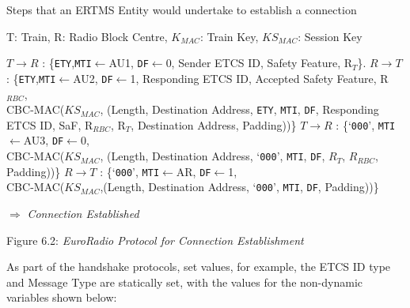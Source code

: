 \documentclass[twoside,11pt,a4paper]{article}
\begin{document}
\begin{algorithm}[H]
\renewcommand{\thealgorithm}{}
\caption{Steps that an ERTMS Entity would undertake to establish a connection}
T: Train, R: Radio Block Centre, $K_{MAC}$: Train Key, $KS_{MAC}$: Session Key
\label{EuroRadio Protocol}
\begin{algorithmic}[1]
\STATE $T\rightarrow{R}$ : \{\texttt{ETY},\texttt{MTI}$\gets$AU1, \texttt{DF}$\gets$0, Sender ETCS ID, Safety Feature, R$_T$\}.
\STATE $R\rightarrow{T}$ : \{\texttt{ETY},\texttt{MTI}$\gets$AU2, \texttt{DF}$\gets$1, Responding ETCS ID, Accepted Safety Feature, R$_{RBC}$,\\CBC-MAC($KS_{MAC}$, (Length, Destination Address, \texttt{ETY}, \texttt{MTI}, \texttt{DF}, Responding ETCS ID, SaF, R$_{RBC}$, R$_T$, Destination Address, Padding))\}
\STATE $T\rightarrow{R}$ : \{`\texttt{000}', \texttt{MTI}$\gets$AU3, \texttt{DF}$\gets$0,\\CBC-MAC($KS_{MAC}$, (Length, Destination Address, `\texttt{000}', \texttt{MTI}, \texttt{DF}, $R_T$, $R_{RBC}$, Padding))\}
\STATE $R\rightarrow{T}$ : \{`\texttt{000}', \texttt{MTI}$\gets$AR, \texttt{DF}$\gets$1,\\CBC-MAC($KS_{MAC}$,(Length, Destination Address, `\texttt{000}', \texttt{MTI}, \texttt{DF}, Padding))\}
\end{algorithmic}
$\Rightarrow$ \textit{Connection Established}
\end{algorithm}
\begin{center}
\vspace{-0.5cm}
Figure 6.2: \textit{EuroRadio Protocol for Connection Establishment}
\end{center}

As part of the handshake protocols, set values, for example, the ETCS ID type and Message Type are statically set, with the values for the non-dynamic variables shown below:
\end{document}
